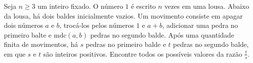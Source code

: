 Seja $n \ge 3$ um inteiro fixado. O número $1$ é escrito $n$ vezes em uma lousa. Abaixo da lousa, há dois baldes inicialmente vazios. Um movimento consiste em apagar dois números $a$ e $b$, trocá-los pelos números $1$ e $a+b$, adicionar uma pedra no primeiro balte e $\mathrm{mdc}(a, b)$ pedras no segundo balde. Após uma quantidade finita de movimentos, há $s$ pedras no primeiro balde e $t$ pedras no segundo balde, em que $s$ e $t$ são inteiros positivos. Encontre todos os possíveis valores da razão $\frac{t}{s}$.
